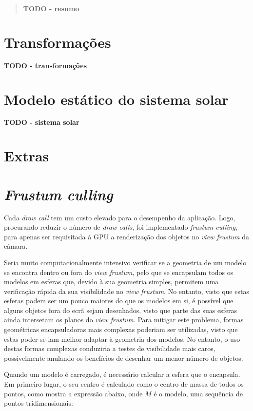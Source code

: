 \documentclass[12pt, a4paper]{article}
\begin{document}
\pagebreak

\begin{abstract}
    \textbf{\color{red} TODO - resumo}
\end{abstract}

\section{Transformações}

\textbf{\color{red} TODO - transformações}

\section{Modelo estático do sistema solar}

\textbf{\color{red} TODO - sistema solar}

\section{Extras}

\section{\emph{Frustum culling}}

Cada \emph{draw call} tem um custo elevado para o desempenho da aplicação. Logo, procurando reduzir
o número de \emph{draw calls}, foi implementado \emph{frustum culling}, para apenas ser requisitada
à GPU a renderização dos objetos no \emph{view frustum} da câmara.

Seria muito computacionalmente intensivo verificar se a geometria de um modelo se encontra dentro ou
fora do \emph{view frustum}, pelo que se encapsulam todos os modelos em esferas que, devido à sua
geometria simples, permitem uma verificação rápida da sua visibilidade no \emph{view frustum}. No
entanto, visto que estas esferas podem ser um pouco maiores do que os modelos em si, é possível que
alguns objetos fora do ecrã sejam desenhados, visto que parte das suas esferas ainda intersetam os
planos do \emph{view frustum}. Para mitigar este problema, formas geométricas encapsuladoras mais
complexas poderiam ser utilizadas, visto que estas poder-se-iam melhor adaptar à geometria dos
modelos. No entanto, o uso destas formas complexas conduziria a testes de visibilidade mais caros,
possivelmente anulando os benefícios de desenhar um menor número de objetos.

Quando um modelo é carregado, é necessário calcular a esfera que o encapsula. Em primeiro lugar, o
seu centro é calculado como o centro de massa de todos os pontos, como mostra a expressão abaixo,
onde $M$ é o modelo, uma sequência de pontos tridimensionais:
\end{document}
